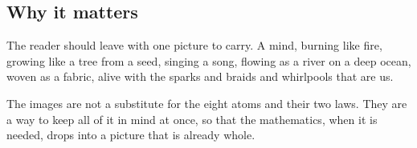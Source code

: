 \subsection{Why it matters}

The reader should leave with one picture to carry. A mind, burning like fire, growing like a tree from a seed, singing a song, flowing as a river on a deep ocean, woven as a fabric, alive with the sparks and braids and whirlpools that are us.

The images are not a substitute for the eight atoms and their two laws. They are a way to keep all of it in mind at once, so that the mathematics, when it is needed, drops into a picture that is already whole.
